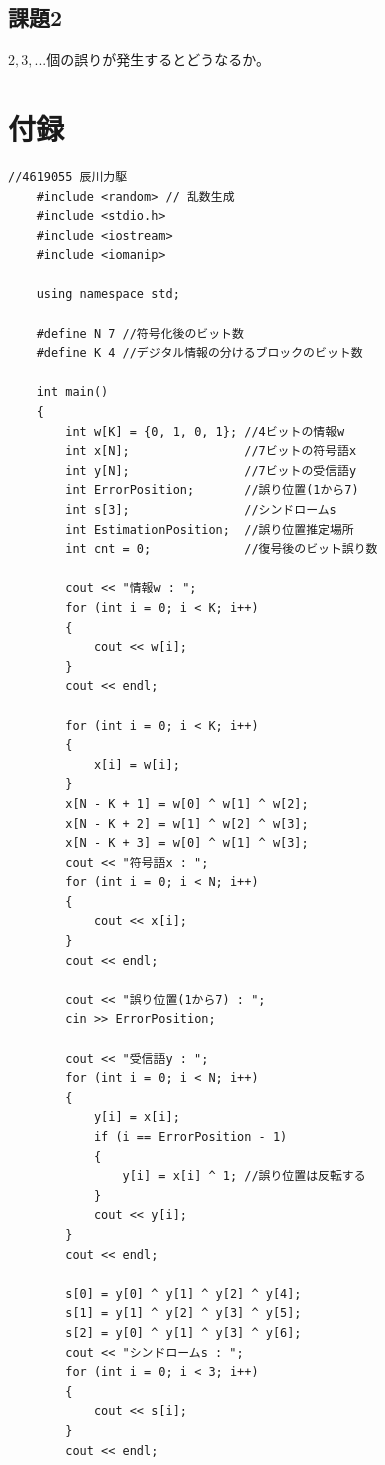 \documentclass[12pt]{jarticle}
\begin{document}
\subsection{課題2}
\begin{shadebox}
    $2,3,...$個の誤りが発生するとどうなるか。
\end{shadebox}

\clearpage
\appendix
\section{付録}
\begin{lstlisting}[style = lstcpp,caption=kadai3\_2.cpp]
    //4619055 辰川力駆
    #include <random> // 乱数生成
    #include <stdio.h>
    #include <iostream>
    #include <iomanip>
    
    using namespace std;
    
    #define N 7 //符号化後のビット数
    #define K 4 //デジタル情報の分けるブロックのビット数
    
    int main()
    {
        int w[K] = {0, 1, 0, 1}; //4ビットの情報w
        int x[N];                //7ビットの符号語x
        int y[N];                //7ビットの受信語y
        int ErrorPosition;       //誤り位置(1から7)
        int s[3];                //シンドロームs
        int EstimationPosition;  //誤り位置推定場所
        int cnt = 0;             //復号後のビット誤り数
    
        cout << "情報w : ";
        for (int i = 0; i < K; i++)
        {
            cout << w[i];
        }
        cout << endl;
    
        for (int i = 0; i < K; i++)
        {
            x[i] = w[i];
        }
        x[N - K + 1] = w[0] ^ w[1] ^ w[2];
        x[N - K + 2] = w[1] ^ w[2] ^ w[3];
        x[N - K + 3] = w[0] ^ w[1] ^ w[3];
        cout << "符号語x : ";
        for (int i = 0; i < N; i++)
        {
            cout << x[i];
        }
        cout << endl;
    
        cout << "誤り位置(1から7) : ";
        cin >> ErrorPosition;
    
        cout << "受信語y : ";
        for (int i = 0; i < N; i++)
        {
            y[i] = x[i];
            if (i == ErrorPosition - 1)
            {
                y[i] = x[i] ^ 1; //誤り位置は反転する
            }
            cout << y[i];
        }
        cout << endl;
    
        s[0] = y[0] ^ y[1] ^ y[2] ^ y[4];
        s[1] = y[1] ^ y[2] ^ y[3] ^ y[5];
        s[2] = y[0] ^ y[1] ^ y[3] ^ y[6];
        cout << "シンドロームs : ";
        for (int i = 0; i < 3; i++)
        {
            cout << s[i];
        }
        cout << endl;
    

\end{lstlisting}
\end{document}
